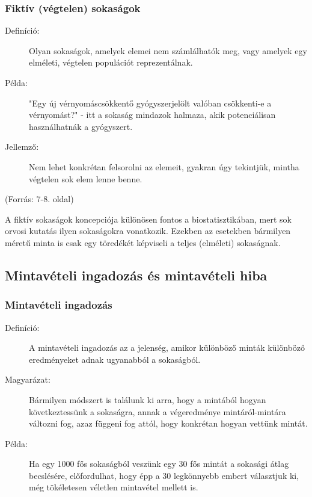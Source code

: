 \documentclass[a4paper,12pt]{article}
\begin{document}
    \subsubsection{Fiktív (végtelen) sokaságok}

    \begin{description}
        \item[Definíció:] Olyan sokaságok, amelyek elemei nem számlálhatók meg, vagy amelyek egy elméleti, végtelen populációt reprezentálnak.
        \item[Példa:] "Egy új vérnyomáscsökkentő gyógyszerjelölt valóban csökkenti-e a vérnyomást?" - itt a sokaság mindazok halmaza, akik potenciálisan használhatnák a gyógyszert.
        \item[Jellemző:] Nem lehet konkrétan felsorolni az elemeit, gyakran úgy tekintjük, mintha végtelen sok elem lenne benne.
    \end{description}(Forrás: 7-8. oldal)

    A fiktív sokaságok koncepciója különösen fontos a biostatisztikában, mert sok orvosi kutatás ilyen sokaságokra vonatkozik. Ezekben az esetekben bármilyen méretű minta is csak egy töredékét képviseli a teljes (elméleti) sokaságnak.

    \subsection{Mintavételi ingadozás és mintavételi hiba}

    \subsubsection{Mintavételi ingadozás}

    \begin{description}
        \item[Definíció:] A mintavételi ingadozás az a jelenség, amikor különböző minták különböző eredményeket adnak ugyanabból a sokaságból.

        \item[Magyarázat:] Bármilyen módszert is találunk ki arra, hogy a mintából hogyan következtessünk a sokaságra, annak a végeredménye mintáról-mintára változni fog, azaz függeni fog attól, hogy konkrétan hogyan vettünk mintát.

        \item[Példa:] Ha egy 1000 fős sokaságból veszünk egy 30 fős mintát a sokasági átlag becslésére, előfordulhat, hogy épp a 30 legkönnyebb embert választjuk ki, még tökéletesen véletlen mintavétel mellett is.
    \end{description}
\end{document}

